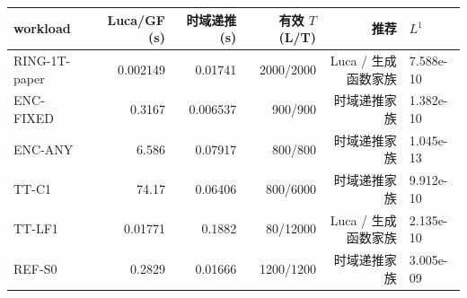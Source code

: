 \begin{tabular}{lrrrrl}
\toprule
 workload & Luca/GF (s) & 时域递推 (s) & 有效 $T$ (L/T) & 推荐 & $L^1$ \\
\midrule
RING-1T-paper & 0.002149 & 0.01741 & 2000/2000 & Luca / 生成函数家族 & 7.588e-10 \\
ENC-FIXED & 0.3167 & 0.006537 & 900/900 & 时域递推家族 & 1.382e-10 \\
ENC-ANY & 6.586 & 0.07917 & 800/800 & 时域递推家族 & 1.045e-13 \\
TT-C1 & 74.17 & 0.06406 & 800/6000 & 时域递推家族 & 9.912e-10 \\
TT-LF1 & 0.01771 & 0.1882 & 80/12000 & Luca / 生成函数家族 & 2.135e-10 \\
REF-S0 & 0.2829 & 0.01666 & 1200/1200 & 时域递推家族 & 3.005e-09 \\
\bottomrule
\end{tabular}
